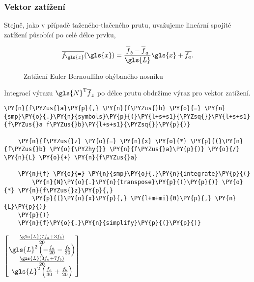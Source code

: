 \subsubsection{Vektor zatížení}

Stejně, jako v případě taženého-tlačeného prutu, uvažujeme lineární spojité zatížení působící po celé délce prvku,

\begin{equation}
    \overline{f_{\gls{z}}}(\gls{x}) = \frac{\overline{f}_b - \overline{f}_a}{\gls{L}} \gls{x} + \overline{f_a}.
\end{equation}
\begin{figure}[H]
    
    \caption{Zatížení Euler-Bernoulliho ohýbaného nosníku}
    \label{fig:beam_load}
\end{figure}        

Integrací výrazu $\gls{N}^\mathrm{T} \overline{f}_z$ po délce prutu obdržíme výraz pro vektor zatížení.

\begin{tcolorbox}[breakable, size=fbox, boxrule=1pt, pad at break*=1mm,colback=cellbackground, colframe=cellborder]
    \begin{Verbatim}[commandchars=\\\{\}]
    \PY{n}{f\PYZus{}a}\PY{p}{,} \PY{n}{f\PYZus{}b} \PY{o}{=} \PY{n}{smp}\PY{o}{.}\PY{n}{symbols}\PY{p}{(}\PY{l+s+s1}{\PYZsq{}}\PY{l+s+s1}{f\PYZus{}a f\PYZus{}b}\PY{l+s+s1}{\PYZsq{}}\PY{p}{)}
    
    \PY{n}{f\PYZus{}z} \PY{o}{=} \PY{n}{x} \PY{o}{*} \PY{p}{(}\PY{n}{f\PYZus{}b} \PY{o}{\PYZhy{}} \PY{n}{f\PYZus{}a}\PY{p}{)} \PY{o}{/} \PY{n}{L} \PY{o}{+} \PY{n}{f\PYZus{}a}
    
    \PY{n}{f} \PY{o}{=} \PY{n}{smp}\PY{o}{.}\PY{n}{integrate}\PY{p}{(}
        \PY{n}{N}\PY{o}{.}\PY{n}{transpose}\PY{p}{(}\PY{p}{)} \PY{o}{*} \PY{n}{f\PYZus{}z}\PY{p}{,}
        \PY{p}{(}\PY{n}{x}\PY{p}{,} \PY{l+m+mi}{0}\PY{p}{,} \PY{n}{L}\PY{p}{)}
    \PY{p}{)}
    \PY{n}{f}\PY{o}{.}\PY{n}{simplify}\PY{p}{(}\PY{p}{)}
    \end{Verbatim}
\end{tcolorbox}
     
                
        
    $\displaystyle \left[\begin{matrix}\frac{\gls{L} \left(7 f_{a} + 3 f_{b}\right)}{20}\\\gls{L}^{2} \left(- \frac{f_{a}}{20} - \frac{f_{b}}{30}\right)\\\frac{\gls{L} \left(3 f_{a} + 7 f_{b}\right)}{20}\\\gls{L}^{2} \left(\frac{f_{a}}{30} + \frac{f_{b}}{20}\right)\end{matrix}\right]$

